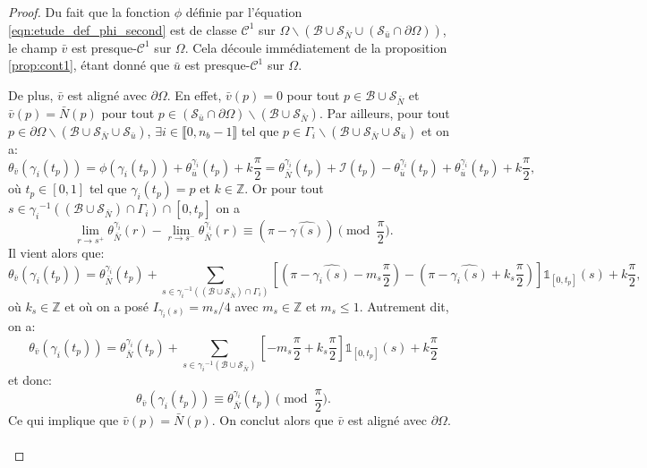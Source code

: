 \begin{proof}
    Du fait que la fonction $\phi$ définie par l'équation \eqref{eqn:etude_def_phi_second} est de classe $\mathcal{C}^1$ sur $\Omega\backslash(\mathcal{B}\cup\mathcal{S}_{\bar{N}}\cup(\mathcal{S}_{\bar{u}}\cap\partial\Omega))$, le champ $\bar{v}$ est presque-$\mathcal{C}^1$ sur $\Omega$. Cela découle immédiatement de la proposition \ref{prop:cont1}, étant donné que $\bar{u}$ est presque-$\mathcal{C}^1$ sur $\Omega$.

    De plus, $\bar{v}$ est aligné avec $\partial\Omega$. En effet, $\bar{v}(p)=0$ pour tout $p\in\mathcal{B}\cup\mathcal{S}_{\bar{N}}$ et $\bar{v}(p)=\bar{N}(p)$ pour tout $p\in(\mathcal{S}_{\bar{u}}\cap\partial\Omega)\backslash(\mathcal{B}\cup\mathcal{S}_{\bar{N}})$. Par ailleurs, pour tout $p\in\partial\Omega\backslash(\mathcal{B}\cup\mathcal{S}_{\bar{N}}\cup\mathcal{S}_{\bar{u}})$, $\exists i\in\llbracket0, n_b-1\rrbracket$ tel que $p\in\Gamma_i\backslash(\mathcal{B}\cup\mathcal{S}_{\bar{N}}\cup\mathcal{S}_{\bar{u}})$ et on a:
    $$\theta_{\bar{v}}(\gamma_i(t_p))=\phi(\gamma_i(t_p))+\theta_{\bar{u}}^{\gamma_i}(t_p)+k\frac{\pi}{2}=\theta_{\bar{N}}^{\gamma_i}(t_p)+\mathcal{I}(t_p)-\theta_{\bar{u}}^{\gamma_i}(t_p)+\theta_{\bar{u}}^{\gamma_i}(t_p)+k\frac{\pi}{2},$$
    où $t_p\in[0,1]$ tel que $\gamma_i(t_p)=p$ et $k\in\mathbb{Z}$. Or pour tout $s\in{\gamma_i}^{-1}((\mathcal{B}\cup\mathcal{S}_{\bar{N}})\cap\Gamma_i)\cap[0, t_p]$ on a
    $$
    \lim_{r\rightarrow s^+}\theta^{\gamma_i}_{\bar{N}}(r) - \lim_{r\rightarrow s^-}\theta^{\gamma_i}_{\bar{N}}(r)\equiv(\pi-\widehat{\gamma(s)})\pmod{\frac{\pi}{2}}.
    $$
    Il vient alors que:
    $$
    \theta_{\bar{v}}(\gamma_i(t_p))=\theta_{\bar{N}}^{\gamma_i}(t_p)+\displaystyle\sum_{s\in{\gamma_i}^{-1}((\mathcal{B}\cup\mathcal{S}_{\bar{N}})\cap\Gamma_i)}\left[\left(\pi-\widehat{\gamma_i(s)}-m_s\frac{\pi}{2}\right)-\left(\pi-\widehat{\gamma_i(s)}+k_s\frac{\pi}{2}\right)\right]\mathbb{1}_{[0, t_p]}(s)+k\frac{\pi}{2},
    $$
    où $k_s\in\mathbb{Z}$ et où on a posé $I_{\gamma_i(s)}=m_s/4$ avec $m_s\in\mathbb{Z}$ et $m_s\leq1$. Autrement dit, on a:
    $$
    \theta_{\bar{v}}(\gamma_i(t_p))=\theta_{\bar{N}}^{\gamma_i}(t_p)+\displaystyle\sum_{s\in{\gamma_i}^{-1}(\mathcal{B}\cup\mathcal{S}_{\bar{N}})}\left[-m_s\frac{\pi}{2}+k_s\frac{\pi}{2}\right]\mathbb{1}_{[0, t_p]}(s)+k\frac{\pi}{2}$$
    et donc:
    $$
    \theta_{\bar{v}}(\gamma_i(t_p))\equiv\theta_{\bar{N}}^{\gamma_i}(t_p)\pmod{\frac{\pi}{2}}.
    $$
    Ce qui implique que $\bar{v}(p)=\bar{N}(p)$. On conclut alors que $\bar{v}$ est aligné avec $\partial\Omega$.\\\\

\end{proof}
